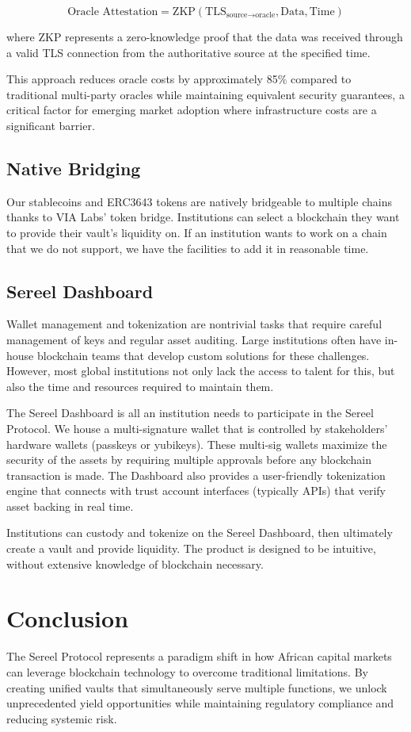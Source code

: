 \documentclass[12pt]{article}
\begin{document}
\begin{equation}
\text{Oracle Attestation} = \text{ZKP}(\text{TLS}_{\text{source} \rightarrow \text{oracle}}, \text{Data}, \text{Time})
\end{equation}

where ZKP represents a zero-knowledge proof that the data was received through a valid TLS connection from the authoritative source at the specified time.

This approach reduces oracle costs by approximately 85\% compared to traditional multi-party oracles while maintaining equivalent security guarantees, a critical factor for emerging market adoption where infrastructure costs are a significant barrier.

\subsection{Native Bridging}
Our stablecoins and ERC3643 tokens are natively bridgeable to multiple chains thanks to VIA Labs' token bridge. Institutions can select a blockchain they want to provide their vault's liquidity on. If an institution wants to work on a chain that we do not support, we have the facilities to add it in reasonable time.
\subsection{Sereel Dashboard}
Wallet management and tokenization are nontrivial tasks that require careful management of keys and regular asset auditing. Large institutions often have in-house blockchain teams that develop custom solutions for these challenges. However, most global institutions not only lack the access to talent for this, but also the time and resources required to maintain them. 

The Sereel Dashboard is all an institution needs to participate in the Sereel Protocol. We house a multi-signature wallet that is controlled by stakeholders' hardware wallets (passkeys or yubikeys). These multi-sig wallets maximize the security of the assets by requiring multiple approvals before any blockchain transaction is made. The Dashboard also provides a user-friendly tokenization engine that connects with trust account interfaces (typically APIs) that verify asset backing in real time.

Institutions can custody and tokenize on the Sereel Dashboard, then ultimately create a vault and provide liquidity. The product is designed to be intuitive, without extensive knowledge of blockchain necessary.

\section{Conclusion}

The Sereel Protocol represents a paradigm shift in how African capital markets can leverage blockchain technology to overcome traditional limitations. By creating unified vaults that simultaneously serve multiple functions, we unlock unprecedented yield opportunities while maintaining regulatory compliance and reducing systemic risk.
\end{document}

